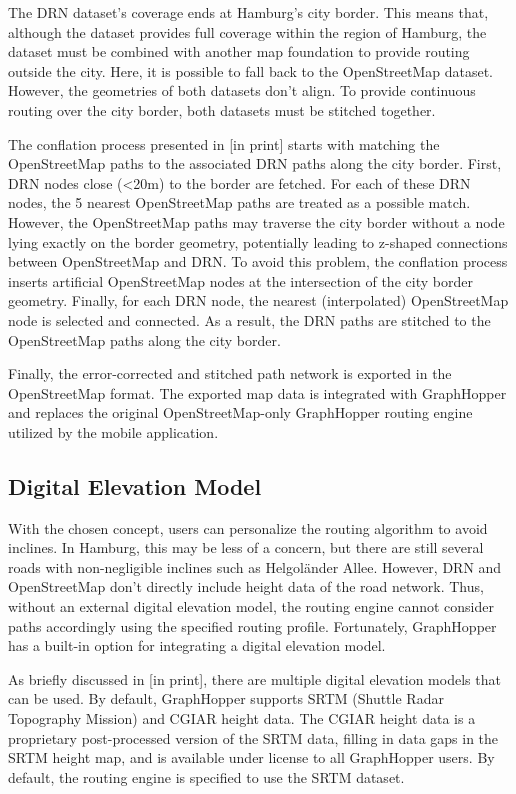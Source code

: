 The DRN dataset's coverage ends at Hamburg's city border. This means that, although the dataset provides full coverage within the region of Hamburg, the dataset must be combined with another map foundation to provide routing outside the city. Here, it is possible to fall back to the OpenStreetMap dataset. However, the geometries of both datasets don't align. To provide continuous routing over the city border, both datasets must be stitched together. 

The conflation process presented in [in print] starts with matching the OpenStreetMap paths to the associated DRN paths along the city border. First, DRN nodes close (<20m) to the border are fetched. For each of these DRN nodes, the 5 nearest OpenStreetMap paths are treated as a possible match. However, the OpenStreetMap paths may traverse the city border without a node lying exactly on the border geometry, potentially leading to z-shaped connections between OpenStreetMap and DRN. To avoid this problem, the conflation process inserts artificial OpenStreetMap nodes at the intersection of the city border geometry. Finally, for each DRN node, the nearest (interpolated) OpenStreetMap node is selected and connected. As a result, the DRN paths are stitched to the OpenStreetMap paths along the city border.

Finally, the error-corrected and stitched path network is exported in the OpenStreetMap format. The exported map data is integrated with GraphHopper and replaces the original OpenStreetMap-only GraphHopper routing engine utilized by the mobile application.

\subsection{Digital Elevation Model}

With the chosen concept, users can personalize the routing algorithm to avoid inclines. In Hamburg, this may be less of a concern, but there are still several roads with non-negligible inclines such as Helgoländer Allee. However, DRN and OpenStreetMap don't directly include height data of the road network. Thus, without an external digital elevation model, the routing engine cannot consider paths accordingly using the specified routing profile. Fortunately, GraphHopper has a built-in option for integrating a digital elevation model.

As briefly discussed in [in print], there are multiple digital elevation models that can be used. By default, GraphHopper supports SRTM (Shuttle Radar Topography Mission) \cite{farr_shuttle_2000, farr_shuttle_2007} and CGIAR \cite{jarvis_hole_2008} height data. The CGIAR height data is a proprietary post-processed version of the SRTM data, filling in data gaps in the SRTM height map, and is available under license to all GraphHopper users. By default, the routing engine is specified to use the SRTM dataset.

